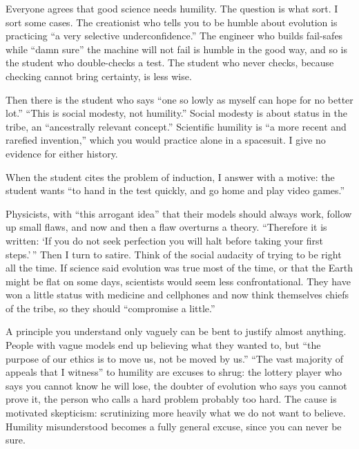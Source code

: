 
Everyone agrees that good science needs humility. The question is what sort. I sort some cases. The creationist who tells you to be humble about evolution is practicing ``a very selective underconfidence.'' The engineer who builds fail-safes while ``damn sure'' the machine will not fail is humble in the good way, and so is the student who double-checks a test. The student who never checks, because checking cannot bring certainty, is less wise.

Then there is the student who says ``one so lowly as myself can hope for no better lot.'' ``This is social modesty, not humility.'' Social modesty is about status in the tribe, an ``ancestrally relevant concept.'' Scientific humility is ``a more recent and rarefied invention,'' which you would practice alone in a spacesuit. I give no evidence for either history. 

When the student cites the problem of induction, I answer with a motive: the student wants ``to hand in the test quickly, and go home and play video games.''

Physicists, with ``this arrogant idea'' that their models should always work, follow up small flaws, and now and then a flaw overturns a theory. ``Therefore it is written: `If you do not seek perfection you will halt before taking your first steps.'\,'' Then I turn to satire. Think of the social audacity of trying to be right all the time. If science said evolution was true most of the time, or that the Earth might be flat on some days, scientists would seem less confrontational. They have won a little status with medicine and cellphones and now think themselves chiefs of the tribe, so they should ``compromise a little.''

A principle you understand only vaguely can be bent to justify almost anything. People with vague models end up believing what they wanted to, but ``the purpose of our ethics is to move us, not be moved by us.'' ``The vast majority of appeals that I witness'' to humility are excuses to shrug: the lottery player who says you cannot know he will lose, the doubter of evolution who says you cannot prove it, the person who calls a hard problem probably too hard. The cause is motivated skepticism: scrutinizing more heavily what we do not want to believe. Humility misunderstood becomes a fully general excuse, since you can never be sure. 

